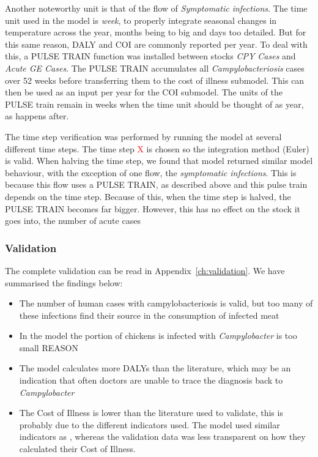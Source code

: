 Another noteworthy unit is that of the flow of \textit{Symptomatic infections}. The time unit used in the model is \textit{week}, to properly integrate seasonal changes in temperature across the year, months being to big and days too detailed. But for this same reason, DALY and COI are commonly reported per year. To deal with this, a PULSE TRAIN function was installed between stocks \textit{CPY Cases} and \textit{Acute GE Cases}. The PULSE TRAIN accumulates all \textit{Campylobacteriosis} cases over 52 weeks before transferring them to the cost of illness submodel. This can then be used as an input per year for the COI submodel. The units of the PULSE train remain in weeks when the time unit should be thought of as year, as happens after. 
    
The time step verification was performed by running the model at several different time steps. The time step \textcolor{red}{X} is chosen so the integration method (Euler) is valid. When halving the time step, we found that model returned similar model behaviour, with the exception of one flow, the \textit{symptomatic infections}. This is because this flow uses a PULSE TRAIN, as described above and this pulse train depends on the time step. Because of this, when the time step is halved, the PULSE TRAIN becomes far bigger. However, this has no effect on the stock it goes into, the number of acute cases 


    
\subsubsection{Validation}    


The complete validation can be read in Appendix~\ref{ch:validation}. We have summarised the findings below:

\begin{itemize}
    \item The number of human cases with campylobacteriosis is valid, but too many of these infections find their source in the consumption of infected meat
    \item In the model the portion of chickens is infected with \textit{Campylobacter} is too small REASON
    \item The model calculates more DALYs than the literature, which may be an indication that often doctors are unable to trace the diagnosis back to \textit{Campylobacter}
    \item The Cost of Illness is lower than the literature used to validate, this is probably due to the different indicators used. The model used similar indicators as \textcite{mangen_campylobacteriosis_2007}, whereas the validation data was less transparent on how they calculated their Cost of Illness.
\end{itemize}

